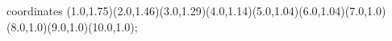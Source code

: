 					coordinates { (1.0,1.75)(2.0,1.46)(3.0,1.29)(4.0,1.14)(5.0,1.04)(6.0,1.04)(7.0,1.0)(8.0,1.0)(9.0,1.0)(10.0,1.0)};